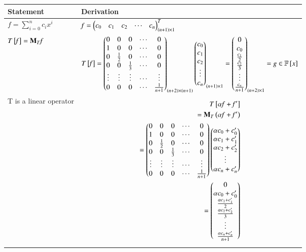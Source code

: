 \begin{table*}[ht!]
\begin{center}
\begin{tabular}{|l|l|}
\hline
\textbf{Statement} & \textbf{Derivation} \\[0.5ex]
\hline
$\mathit{f}=\sum \limits_{i=0}^n c_i x^i$ & $\mathit{f}=\begin{pmatrix}c_0&c_1&c_2&\cdots&c_n\end{pmatrix}^T_{\left(n+1\right)\times1}$
\\ [0.5ex] 
\hline
$T{}\left[\mathit{f}\right]=\mathbf{M}_T\mathit{f}$ & $T{}\left[\mathit{f}\right]=
\begin{pmatrix}0&0&0&\cdots&0\\1&0&0&\cdots&0\\0&\frac{1}{2}&0&\cdots&0\\0&0&\frac{1}{3}&\cdots&0\\\vdots&\vdots&\vdots&\cdots&\vdots\\0&0&0&\cdots&\frac{1}{n+1}\end{pmatrix}_{\left(n+2\right)\times\left(n+1\right)}
\begin{pmatrix}c_0\\c_1\\c_2\\\vdots\\c_n\end{pmatrix}_{\left(n+1\right)\times1}
=\begin{pmatrix}0\\c_0\\\frac{c_1}{2}\\\frac{c_2}{3}\\\vdots\\\frac{c_n}{n+1}\end{pmatrix}_{\left(n+2\right)\times1}=\mathit{g}\in \mathbb{F}{}\left[x\right]$
\\ [0.5ex] 
\hline
T is a linear operator & 
\parbox{10cm}{\begin{align}
T\sbrak{\alpha\mathit{f}+\mathit{f^\prime}}\\
=\vec{M}_T\brak{\alpha\mathit{f}+\mathit{f^\prime}}\\
=\myvec{0&0&0&\cdots&0\\1&0&0&\cdots&0\\0&\frac{1}{2}&0&\cdots&0\\0&0&\frac{1}{3}&\cdots&0\\\vdots&\vdots&\vdots&\cdots&\vdots\\0&0&0&\cdots&\frac{1}{n+1}}
\myvec{\alpha c_0+c_0^\prime\\\alpha c_1+c_1^\prime\\\alpha c_2+c_2^\prime\\\vdots\\\alpha c_n+c_n^\prime}\\
=\myvec{0\\\alpha c_0+c_0^\prime\\\frac{\alpha c_1+c_1^\prime}{2}\\\frac{\alpha c_2+c_2^\prime}{3}\\\vdots\\\frac{\alpha c_n+c_n^\prime}{n+1}}

\end{align}}
\end{tabular}
\end{center}
\end{table*}
